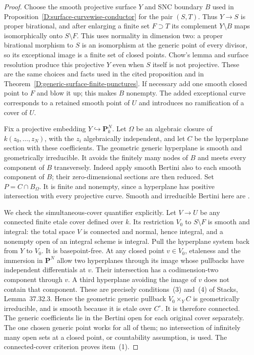 \begin{proof}
Choose the smooth projective surface $Y$ and SNC boundary $B$
used in Proposition~\ref{D:surface-curvewise-conductor} for the
pair $(S,T)$. Thus $Y\to S$ is proper birational, and after
enlarging a finite set $F\supset T$ its complement
$Y\setminus B$ maps isomorphically onto $S\setminus F$.
This uses normality in dimension two: a proper birational
morphism to $S$ is an isomorphism at the generic point of every
divisor, so its exceptional image is a finite set of closed points.
Chow's lemma and surface resolution produce this projective $Y$
even when $S$ itself is not projective. These are the same
choices and facts used in the cited proposition and in
Theorem~\ref{D:generic-surface-finite-punctures}.
If necessary add one smooth closed point to $F$ and blow it up;
this makes $B$ nonempty. The added exceptional curve corresponds
to a retained smooth point of $U$ and introduces no ramification
of a cover of $U$.

Fix a projective embedding $Y\hookrightarrow\mathbf P^N_k$.
Let $\Omega$ be an algebraic closure of
$k(z_0,\ldots,z_N)$, with the $z_i$ algebraically independent,
and let $C$ be the hyperplane section with these coefficients.
The geometric generic hyperplane is smooth and geometrically
irreducible. It avoids the finitely many nodes of $B$ and meets
every component of $B$ transversely. Indeed apply smooth Bertini
also to each smooth component of $B$; their zero-dimensional
sections are then reduced. Set $P=C\cap B_\Omega$. It is finite
and nonempty, since a hyperplane has positive intersection with
every projective curve. Smooth and irreducible Bertini here are
\citep[Lemmas~33.47.3 and~37.32.1--3, Tags~0FD6 and~0G4C,
with the written proofs]{StacksDGenericSurface}.

We check the simultaneous-cover quantifier explicitly. Let
$V\to U$ be any connected finite etale cover defined over $k$.
Its restriction $V_0$ to $S\setminus F$ is smooth and integral:
the total space $V$ is connected and normal, hence integral,
and a nonempty open of an integral scheme is integral.
Pull the hyperplane system back from $Y$ to $V_0$. It is
basepoint-free. At any closed point $v\in V_0$, etaleness and
the immersion in $\mathbf P^N$ allow two hyperplanes through
its image whose pullbacks have independent differentials at $v$.
Their intersection has a codimension-two component through $v$.
A third hyperplane avoiding the image of $v$ does not contain
that component. These are precisely conditions~(3) and~(4) of
Stacks, Lemma~37.32.3. Hence the geometric generic pullback
$V_0\times_{Y}C$ is geometrically irreducible, and is smooth
because it is etale over $C^\circ$. It is therefore connected.
The generic coefficients lie in the Bertini open for each
original cover separately. The one chosen generic point works
for all of them; no intersection of infinitely many open sets
at a closed point, or countability assumption, is used.
The connected-cover criterion proves item~(1).


\end{proof}
